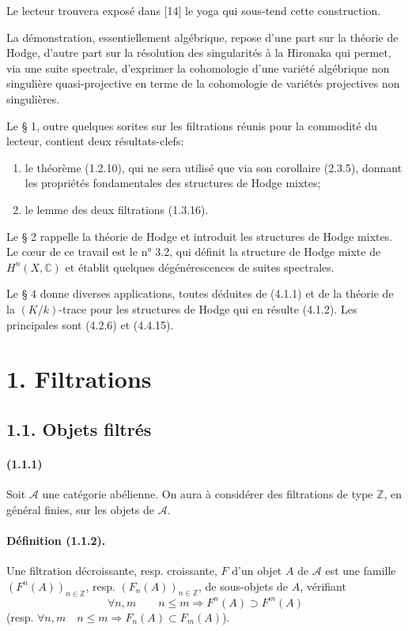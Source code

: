 \documentclass[10pt]{article}
\newcommand{\C}{\mathbb C}
\newcommand{\Z}{\mathbb Z}
\newcommand{\fg}{\guillemotright}
\newcommand{\og}{\guillemotleft}
\newcommand{\calA}{\mathcal A}
\begin{document}
Le lecteur trouvera exposé dans [14] le yoga qui sous-tend cette construction.

La démonstration, essentiellement algébrique, repose d'une part sur la théorie de Hodge, d'autre part sur la résolution des singularités à la Hironaka qui permet, via une suite spectrale, \og d'exprimer\fg{} la cohomologie d'une variété algébrique non singulière quasi-projective en terme de la cohomologie de variétés projectives non singulières.

Le § 1, outre quelques sorites sur les filtrations réunis pour la commodité du lecteur, contient deux résultats-clefs:
\begin{enumerate}[label=\alph*)]
\item le théorème (1.2.10), qui ne sera utilisé que via son corollaire (2.3.5), donnant les propriétés fondamentales des \og structures de Hodge mixtes\fg{};
\item le \og lemme des deux filtrations\fg{} (1.3.16).
\end{enumerate}
Le § 2 rappelle la théorie de Hodge et introduit les structures de Hodge mixtes. Le cœur de ce travail est le n° 3.2, qui définit la structure de Hodge mixte de $H^n(X,\C)$ et établit quelques dégénérescences de suites spectrales.

Le § 4 donne diverses applications, toutes déduites de (4.1.1) et de la théorie de la $(K/k)$-trace pour les structures de Hodge qui en résulte (4.1.2). Les principales sont (4.2.6) et (4.4.15).

\section*{1. Filtrations}
\subsection*{1.1. Objets filtrés}

\paragraph{(1.1.1)} Soit $\calA$ une catégorie abélienne. On aura à considérer des filtrations de type $\Z$, en général finies, sur les objets de $\calA$.

\paragraph{Définition (1.1.2).} Une filtration décroissante, resp. croissante, $F$ d'un objet $A$ de $\calA$ est une famille $(F^n(A))_{n\in\Z}$, resp. $(F_n(A))_{n\in\Z}$, de sous-objets de $A$, vérifiant
\[
\forall n,m\qquad n\le m\Rightarrow F^n(A)\supset F^m(A)
\]
(resp. $\forall n,m\quad n\le m\Rightarrow F_n(A)\subset F_m(A)$).
\end{document}
